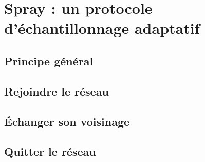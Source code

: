 
\section{Spray : un protocole d'échantillonnage adaptatif}

\subsection{Principe général}

\subsection{Rejoindre le réseau}

\subsection{Échanger son voisinage}

\subsection{Quitter le réseau}

